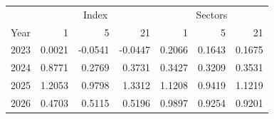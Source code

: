 \begin{tabular}{lrrrrrr}
\toprule
 & \multicolumn{3}{c}{Index} & \multicolumn{3}{c}{Sectors} \\
Year & 1 & 5 & 21 & 1 & 5 & 21 \\
\midrule
2023 & 0.0021 & -0.0541 & -0.0447 & 0.2066 & 0.1643 & 0.1675 \\
2024 & 0.8771 & 0.2769 & 0.3731 & 0.3427 & 0.3209 & 0.3531 \\
2025 & 1.2053 & 0.9798 & 1.3312 & 1.1208 & 0.9419 & 1.1219 \\
2026 & 0.4703 & 0.5115 & 0.5196 & 0.9897 & 0.9254 & 0.9201 \\
\bottomrule
\end{tabular}
